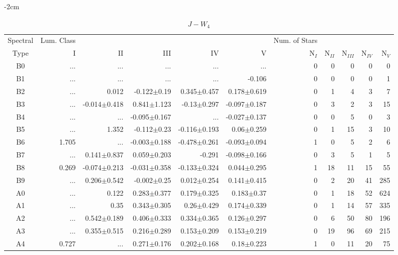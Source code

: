 \begin{table}[t]
\tiny
\centering
\caption{$J-W_{4}$}
\begin{center}
    \addtolength{\leftskip} {-2cm}
    \addtolength{\rightskip}{-2cm}
    \begin{tabular}{c|rrrrr|rrrrr}
    \toprule
    Spectral & Lum. Class & & & & & Num. of Stars & & & &  \\
    Type & I & II & III &  IV & V & N$_{I}$ & N$_{II}$ & N$_{III}$ & N$_{IV}$ & N$_{V}$ \\ \midrule

B0	&	 ...	&	 ...	&	 ...	&	 ...	&	 ...	&	0	&	0	&	0	&	0	&	0	\\
B1	&	 ...	&	 ...	&	 ...	&	 ...	&	-0.106	&	0	&	0	&	0	&	0	&	1	\\
B2	&	 ...	&	0.012	&	-0.122$\pm$0.19	&	0.345$\pm$0.457	&	0.178$\pm$0.619	&	0	&	1	&	4	&	3	&	7	\\
B3	&	 ...	&	-0.014$\pm$0.418	&	0.841$\pm$1.123	&	-0.13$\pm$0.297	&	-0.097$\pm$0.187	&	0	&	3	&	2	&	3	&	15	\\
B4	&	 ...	&	 ...	&	-0.095$\pm$0.167	&	 ...	&	-0.027$\pm$0.137	&	0	&	0	&	5	&	0	&	3	\\
B5	&	 ...	&	1.352	&	-0.112$\pm$0.23	&	-0.116$\pm$0.193	&	0.06$\pm$0.259	&	0	&	1	&	15	&	3	&	10	\\
B6	&	1.705	&	 ...	&	-0.003$\pm$0.188	&	-0.478$\pm$0.261	&	-0.093$\pm$0.094	&	1	&	0	&	5	&	2	&	6	\\
B7	&	 ...	&	0.141$\pm$0.837	&	0.059$\pm$0.203	&	-0.291	&	-0.098$\pm$0.166	&	0	&	3	&	5	&	1	&	5	\\
B8	&	0.269	&	-0.074$\pm$0.213	&	-0.031$\pm$0.358	&	-0.133$\pm$0.324	&	0.044$\pm$0.295	&	1	&	18	&	11	&	15	&	55	\\
B9	&	 ...	&	0.206$\pm$0.542	&	-0.002$\pm$0.25	&	0.012$\pm$0.254	&	0.141$\pm$0.415	&	0	&	2	&	20	&	41	&	285	\\
A0	&	 ...	&	0.122	&	0.283$\pm$0.377	&	0.179$\pm$0.325	&	0.183$\pm$0.37	&	0	&	1	&	18	&	52	&	624	\\
A1	&	 ...	&	0.35	&	0.343$\pm$0.305	&	0.26$\pm$0.429	&	0.174$\pm$0.339	&	0	&	1	&	14	&	57	&	335	\\
A2	&	 ...	&	0.542$\pm$0.189	&	0.406$\pm$0.333	&	0.334$\pm$0.365	&	0.126$\pm$0.297	&	0	&	6	&	50	&	80	&	196	\\
A3	&	 ...	&	0.355$\pm$0.515	&	0.216$\pm$0.289	&	0.153$\pm$0.209	&	0.153$\pm$0.219	&	0	&	19	&	96	&	69	&	215	\\
A4	&	0.727	&	 ...	&	0.271$\pm$0.176	&	0.202$\pm$0.168	&	0.18$\pm$0.223	&	1	&	0	&	11	&	20	&	75	\\

\end{tabular}
\end{center}
\end{table}
